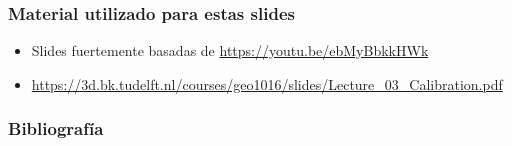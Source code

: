 \begin{frame}
    \frametitle{Material utilizado para estas slides}
    
    \footnotesize
    \begin{itemize}
        \item Slides fuertemente basadas de \url{https://youtu.be/ebMyBbkkHWk}
        \item \url{https://3d.bk.tudelft.nl/courses/geo1016/slides/Lecture_03_Calibration.pdf}
    \end{itemize}
    
\end{frame}

\begin{frame}
	\frametitle{Bibliografía}
	\nocite{hartley2003multiple}
    \nocite{szeliski2022computer}
	
	\printbibliography
	
\end{frame}